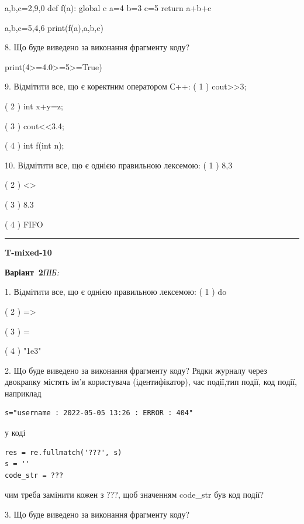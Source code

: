 \documentclass[11pt]{article}
\begin{document}
a,b,c=2,9,0
def f(a):
global c    a=4
    b=3
    c=5
    return a+b+c

a,b,c=5,4,6
print(f(a),a,b,c)

8. Що буде виведено за виконання фрагменту коду?

print(4>=4.0>=5>=True)

9. Відмітити все, що є коректним оператором С++:
( 1 ) cout>>3;

( 2 ) int x+y=z;

( 3 ) cout<<3.4;

( 4 ) int f(int n);

10. Відмітити все, що є однією правильною лексемою:
( 1 ) 8,3

( 2 ) <>

( 3 ) 8.3

( 4 ) FIFO











\vspace{10mm}
\noindent\rule{\textwidth}{0.3pt}
\vspace{8mm}
{\large\textbf{T-mixed-10}}

\textbf{Варіант \No\,2}\hfill \textit{ПІБ:}\,\underline{\hspace{60mm}}
\vspace{4mm}

1. Відмітити все, що є однією правильною лексемою:
( 1 ) do

( 2 ) =>

( 3 ) =

( 4 ) "1e3"

2. Що буде виведено за виконання фрагменту коду?
Рядки журналу через двокрапку містять ім'я користувача (ідентифікатор), час події,тип події, код події, наприклад
\begin{verbatim}
s="username : 2022-05-05 13:26 : ERROR : 404"
\end{verbatim}
у коді 
\begin{verbatim}
res = re.fullmatch('???', s) 
s = ''
code_str = ??? 
\end{verbatim}
чим треба замінити кожен з ???, щоб значенням code\_str був код події? 



3. Що буде виведено за виконання фрагменту коду?
\end{document}
